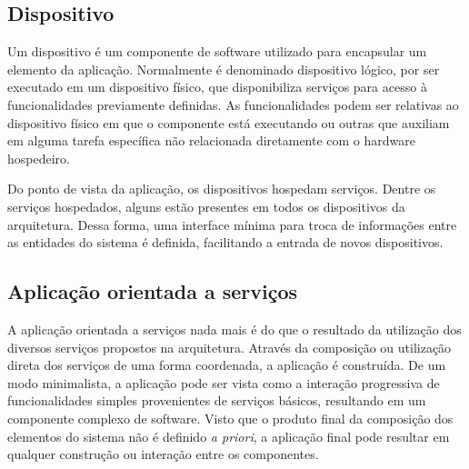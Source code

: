 \subsection{Dispositivo}

Um dispositivo é um componente de software utilizado para encapsular um elemento da aplicação.
Normalmente é denominado dispositivo lógico, por ser executado em um dispositivo físico, que
disponibiliza serviços para acesso à funcionalidades previamente definidas. As funcionalidades podem
ser relativas ao dispositivo físico em que o componente está executando ou outras que auxiliam em
alguma tarefa específica não relacionada diretamente com o hardware hospedeiro.

Do ponto de vista da aplicação, os dispositivos hospedam serviços. Dentre os serviços hospedados,
alguns estão presentes em todos os dispositivos da arquitetura. Dessa forma, uma interface mínima
para troca de informações entre as entidades do sistema é definida, facilitando a entrada de novos
dispositivos.


\subsection{Aplicação orientada a serviços}

A aplicação orientada a serviços nada mais é do que o resultado da utilização dos diversos serviços
propostos na arquitetura. Através da composição ou utilização direta dos serviços de uma forma
coordenada, a aplicação é construída. De um modo minimalista, a aplicação pode ser vista como a
interação progressiva de funcionalidades simples provenientes de serviços básicos, resultando em um
componente complexo de software. Visto que o produto final da composição dos elementos do sistema
não é definido \textit{a priori}, a aplicação final pode resultar em qualquer construção ou
interação entre os componentes.

\iffalse
\subsection{Implantador de serviços}

Como forma de implantar novos serviços nos dispositivos físicos encontrados na rede, é necessário um
software dedicado para esta tarefa. O implantador disponibiliza formas de alterar os dispositivos na
rede, seja enviando novos serviços para serem executados ou modificando as informações do
dispositivo. Como cada dispositivo do sistema possui alguns serviços padrão, entre eles o que
permite o recebimento de novos serviços para serem executados no dispositivo, a integração das
funcionalidades do implantador pode ser feita de forma facilitada.
\fi




